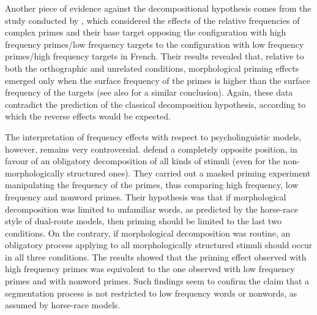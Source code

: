 \documentclass[output=paper]{langsci/langscibook}
\begin{document}
Another piece of evidence against the decompositional hypothesis comes
from the study conducted by %
\citet{GiraudoOrihuela2015}%
%
, which
considered the effects of the relative frequencies of complex primes and
their base target opposing the configuration with high frequency primes/low frequency targets to the configuration with low frequency primes/high frequency targets in French. Their results revealed that, relative
to both the orthographic and unrelated conditions, morphological priming
effects emerged only when the surface frequency of the primes is higher
than the surface frequency of the targets (see also 
\citealt{VogaGiraudo2009} %
%
%
 for a similar conclusion). Again, these data contradict the
prediction of the classical decomposition hypothesis, according to which
the reverse effects would be expected.

The interpretation of frequency effects with respect to psycholinguistic
models, however, remains very controversial. %
%
\citet{McCormickBrysbaertEtAl2009} %
%
defend a completely opposite position, in favour of an
obligatory decomposition of all kinds of stimuli (even for the
non-morphologically structured ones). They carried out a masked priming
experiment manipulating the frequency of the primes, thus comparing high
frequency, low frequency and nonword primes. Their hypothesis was that
if morphological decomposition was limited to unfamiliar words, as
predicted by the horse-race style of dual-route models, then priming
should be limited to the last two conditions. On the contrary, if
morphological decomposition was routine, an obligatory process
applying to all morphologically structured stimuli should occur in all
three conditions. The results showed that the priming effect observed
with high frequency primes was equivalent to the one observed with low
frequency primes and with nonword primes. Such findings seem to confirm
the claim that a segmentation process is not restricted to low frequency
words or nonwords, as assumed by horse-race models.
\end{document}

